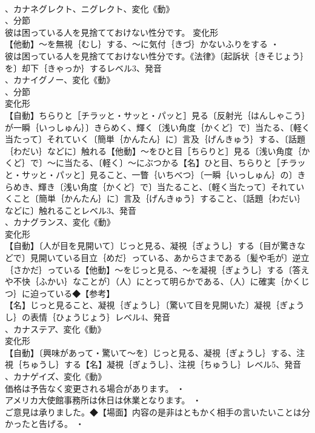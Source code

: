 \documentclass[8pt]{extreport}
\begin{document}
\begin{CJK}{UTF8}{min}
\\	、カナネグレクト、ニグレクト、変化《動》
\\	、分節
\\	彼は困っている人を見捨てておけない性分です。	変化形 
\\	【他動】～を無視｛むし｝する、～に気付｛きづ｝かないふりをする ・
\\	彼は困っている人を見捨てておけない性分です。《法律》〔起訴状｛きそじょう｝を〕却下｛きゃっか｝するレベル3、発音
\\	、カナイグノー、変化《動》
\\	、分節
\\	変化形 
\\	【自動】ちらりと［チラッと・サッと・パッと］見る〔反射光｛はんしゃこう｝が一瞬｛いっしゅん｝〕きらめく、輝く〔浅い角度｛かくど｝で〕当たる、〔軽く当たって〕それていく〔簡単｛かんたん｝に〕言及｛げんきゅう｝する、〔話題｛わだい｝などに〕触れる【他動】～をひと目［ちらりと］見る〔浅い角度｛かくど｝で〕～に当たる、〔軽く〕～にぶつかる【名】ひと目、ちらりと［チラッと・サッと・パッと］見ること、一瞥｛いちべつ｝〔一瞬｛いっしゅん｝の〕きらめき、輝き〔浅い角度｛かくど｝で〕当たること、〔軽く当たって〕それていくこと〔簡単｛かんたん｝に〕言及｛げんきゅう｝すること、〔話題｛わだい｝などに〕触れることレベル3、発音
\\	、カナグランス、変化《動》
\\	変化形 
\\	【自動】〔人が目を見開いて〕じっと見る、凝視｛ぎょうし｝する〔目が驚きなどで〕見開いている目立｛めだ｝っている、あからさまである〔髪や毛が〕逆立｛さかだ｝っている【他動】～をじっと見る、～を凝視｛ぎょうし｝する〔答えや不快｛ふかい｝なことが〕（人）にとって明らかである、（人）に確実｛かくじつ｝に迫っている◆【参考】
\\	【名】じっと見ること、凝視｛ぎょうし｝〔驚いて目を見開いた〕凝視｛ぎょうし｝の表情｛ひょうじょう｝レベル4、発音
\\	、カナステア、変化《動》
\\	変化形 
\\	【自動】〔興味があって・驚いて～を〕じっと見る、凝視｛ぎょうし｝する、注視｛ちゅうし｝する【名】凝視｛ぎょうし｝、注視｛ちゅうし｝レベル5、発音
\\	、カナゲイズ、変化《動》
\\	価格は予告なく変更される場合があります。 ・
\\	アメリカ大使館事務所は休日は休業となります。 ・
\\	ご意見は承りました。◆【場面】内容の是非はともかく相手の言いたいことは分かったと告げる。 ・

\end{CJK}
\end{document}
